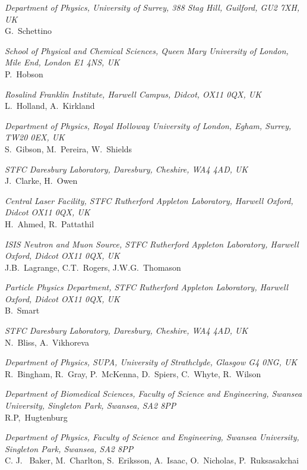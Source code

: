 \vspace{0.5cm}
\noindent \textit{Department of Physics, University of Surrey, 388 Stag Hill, Guilford, GU2 7XH, UK} \\
G.~Schettino
 
\vspace{0.5cm}
\noindent \textit{School of Physical and Chemical Sciences, Queen Mary University of London, Mile End, London E1 4NS, UK} \\
P.~Hobson
 
\vspace{0.5cm}
\noindent \textit{Rosalind Franklin Institute, Harwell Campus, Didcot, OX11 0QX, UK} \\
L.~Holland, A.~Kirkland
 
\vspace{0.5cm}
\noindent \textit{Department of Physics, Royal Holloway University of London, Egham, Surrey, TW20 0EX, UK} \\
S.~Gibson, M.~Pereira, W.~Shields
 
\vspace{0.5cm}
\noindent \textit{STFC Daresbury Laboratory, Daresbury, Cheshire, WA4 4AD, UK} \\
J.~Clarke, H.~Owen
 
\vspace{0.5cm}
\noindent \textit{Central Laser Facility, STFC Rutherford Appleton Laboratory, Harwell Oxford, Didcot OX11 0QX, UK} \\
H.~Ahmed, R.~Pattathil
 
\vspace{0.5cm}
\noindent \textit{ISIS Neutron and Muon Source, STFC Rutherford Appleton Laboratory, Harwell Oxford, Didcot OX11 0QX, UK} \\
J.B.~Lagrange, C.T.~Rogers, J.W.G.~Thomason
 
\vspace{0.5cm}
\noindent \textit{Particle Physics Department, STFC Rutherford Appleton Laboratory, Harwell Oxford, Didcot OX11 0QX, UK} \\
B.~Smart
 
\vspace{0.5cm}
\noindent \textit{STFC Daresbury Laboratory, Daresbury, Cheshire, WA4 4AD, UK} \\
N.~Bliss, A.~Vikhoreva
 
\vspace{0.5cm}
\noindent \textit{Department of Physics, SUPA, University of Strathclyde, Glasgow G4 0NG, UK} \\
R.~Bingham, R.~Gray, P.~McKenna, D.~Spiers, C.~Whyte, R.~Wilson
 
\vspace{0.5cm}
\noindent \textit{Department of Biomedical Sciences, Faculty of Science and Engineering, Swansea University, Singleton Park, Swansea, SA2 8PP} \\
R.P,~Hugtenburg
 
\vspace{0.5cm}
\noindent \textit{Department of Physics, Faculty of Science and Engineering, Swansea University, Singleton Park, Swansea, SA2 8PP} \\
C. J. ~Baker, M.~Charlton, S.~Eriksson, A.~Isaac, O.~Nicholas, P.~Ruksasakchai
 
\vspace{0.5cm}
